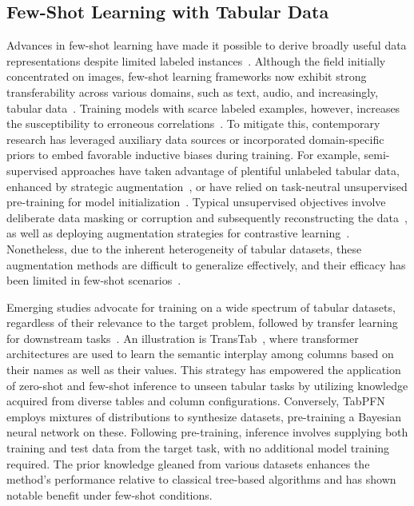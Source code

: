 \subsection{Few-Shot Learning with Tabular Data} Advances in few-shot learning have made it possible to derive broadly useful data representations despite limited labeled instances~\cite{chen2018closer}. Although the field initially concentrated on images, few-shot learning frameworks now exhibit strong transferability across various domains, such as text, audio, and increasingly, tabular data~\cite{majumder2022few,nam2023stunt,schick2021exploiting}. Training models with scarce labeled examples, however, increases the susceptibility to erroneous correlations~\cite{bartlett2021deep}. To mitigate this, contemporary research has leveraged auxiliary data sources or incorporated domain-specific priors to embed favorable inductive biases during training. For example, semi-supervised approaches have taken advantage of plentiful unlabeled tabular data, enhanced by strategic augmentation~\cite{ucar2021subtab,yoon2020vime}, or have relied on task-neutral unsupervised pre-training for model initialization~\cite{somepalli2021saint}. Typical unsupervised objectives involve deliberate data masking or corruption and subsequently reconstructing the data~\cite{arik2021tabnet,majmundar2022met}, as well as deploying augmentation strategies for contrastive learning~\cite{bahri2022scarf,chen2020simple}. Nonetheless, due to the inherent heterogeneity of tabular datasets, these augmentation methods are difficult to generalize effectively, and their efficacy has been limited in few-shot scenarios~\cite{nam2023stunt}.

Emerging studies advocate for training on a wide spectrum of tabular datasets, regardless of their relevance to the target problem, followed by transfer learning for downstream tasks~\cite{zhang2023generative,levin2022transfer,zhu2023xtab}. An illustration is TransTab~\cite{wang2022transtab}, where transformer architectures are used to learn the semantic interplay among columns based on their names as well as their values. This strategy has empowered the application of zero-shot and few-shot inference to unseen tabular tasks by utilizing knowledge acquired from diverse tables and column configurations. Conversely, TabPFN~\cite{hollmann2022tabpfn} employs mixtures of distributions to synthesize datasets, pre-training a Bayesian neural network on these. Following pre-training, inference involves supplying both training and test data from the target task, with no additional model training required. The prior knowledge gleaned from various datasets enhances the method’s performance relative to classical tree-based algorithms and has shown notable benefit under few-shot conditions.

